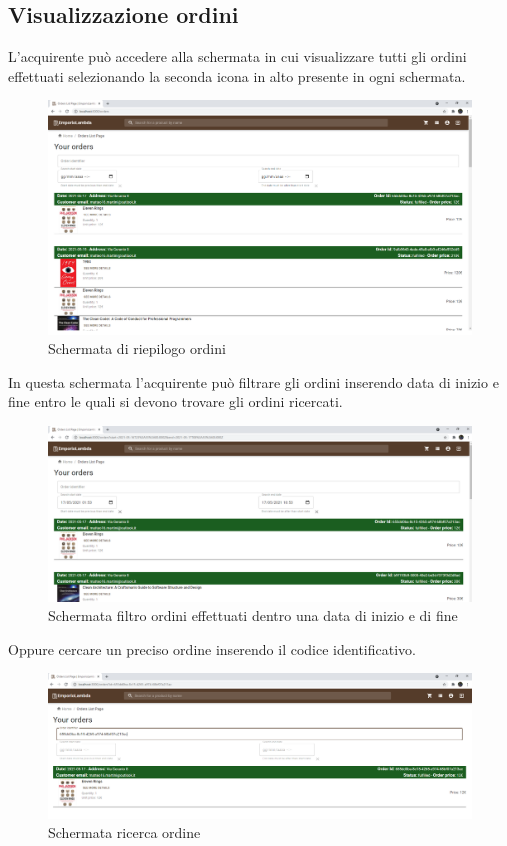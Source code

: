 \subsection{Visualizzazione ordini}\label{ordiniAcq}
L'acquirente può accedere alla schermata in cui visualizzare tutti gli ordini effettuati selezionando la seconda icona in alto presente in ogni schermata.
\begin{figure}[H]
	\centering
	\includegraphics[scale=0.3]{Immagini/Acquirente/orders.png}
	\caption{Schermata di riepilogo ordini}
	\label{fig:Ordini}
\end{figure}
In questa schermata l'acquirente può filtrare gli ordini inserendo data di inizio e fine entro le quali si devono trovare gli ordini ricercati.
\begin{figure}[H]
	\centering
	\includegraphics[scale=0.3]{Immagini/Acquirente/orders with date filters.png}
	\caption{Schermata filtro ordini effettuati dentro una data di inizio e di fine}
	\label{fig:OrdiniData}
\end{figure}
Oppure cercare un preciso ordine inserendo il codice identificativo.
\begin{figure}[H]
	\centering
	\includegraphics[scale=0.3]{Immagini/Acquirente/orders with search.png}
	\caption{Schermata ricerca ordine}
	\label{fig:OrdiniNumero}
\end{figure}
